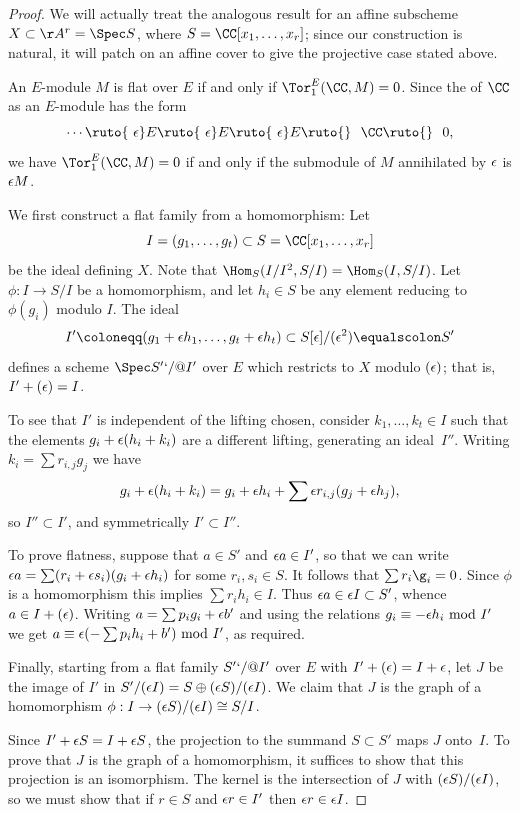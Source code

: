 \begin{proof}
We will actually treat the analogous result for an affine subscheme $X
\subset \AA^r = \Spec S$, where
$S = \CC[x_{1}, \dots, x_{r}]$; since our construction is natural,
it will patch on an affine cover to give the projective case stated above.

An $E$-module $M$ is flat
%
over $E$ if and only if $\Tor_1^E(\CC,M) = 0$.
Since the
%
of $\CC$ as an $E$-module has the form
$$
\cdots \ruto {\ \eps} E \ruto {\ \eps} E \ruto {\ \eps} E
\ruto{}\ \ \CC \ruto{}\ \ 0,
$$
we have $\Tor_1^E(\CC,M)=0$ if and only if the submodule of $M$
annihilated by $\eps$ is $\eps M$.

We first construct a flat family from a homomorphism: Let
$$I = (g_1,\dots,
g_t)\subset S = \CC[x_1,\dots, x_r]
$$
be the ideal defining $X$.
Note that $\Hom_S(I/I^2, S/I) = \Hom_S(I,S/I)$. Let $\phi: I\to S/I$
be a homomorphism, and let $h_i\in S$ be
any element reducing to $\phi(g_i)$ modulo $I$.  The ideal
$$
I' \coloneqq  (g_1+\eps h_1,\dots, g_t+\eps h_t)\subset
S[\eps]/(\eps^2) \equalscolon S'
$$
defines a scheme $\Spec S'`/@I'$  over $E$ which restricts to $X$ modulo
$(\eps)$; that is, $I' +\nobreak (\eps) =\nobreak  I$.

To see that $I'$ is
independent of the lifting chosen,
consider
$k_1,\dots,k_t\in I$
such
that the elements $g_i+\eps(h_i+k_i)$ are a different lifting,
generating an ideal~$I''$.
Writing $k_i = \sum r_{i,j}g_j$ we have
$$
g_i+\eps(h_i+k_i) = g_i+\eps h_i+ \sum \eps r_{i,j}(g_j+\eps h_j)
,
$$
 so
$I'' \subset I'$, and symmetrically $I' \subset I''$.

To prove flatness, suppose that $a\in S'$ and  $\eps a  \in I'$,
so that we can write  $\eps a= \sum(r_i+\eps s_i)(g_i+\eps h_i)$ for
some $r_{i}, s_{i} \in S$.
It follows that
$\sum r_i\g_i = 0$. Since $\phi$ is a homomorphism this implies $\sum
r_i h_i \in I$. Thus
$\eps a \in  \eps I\subset S'$, whence $a\in I + (\eps)$.  Writing $a
=\sum p_i g_i+\eps b'$
and using the relations $g_i \equiv -\eps h_i \hbox{ mod } I'$ we get
 $a \equiv \eps (-\sum p_i h_i+b') \hbox{ mod } I'$, as required.

Finally, starting from a flat family $S'`/@I'$ over $E$ with $I' + (\eps)
= I +\eps$,
let $J$ be the image of $I'$ in $S'/(\eps I) = S \oplus (\eps S)/(\eps
I)$. We claim that $J$ is the graph of a homomorphism $\phi: I \to
(\eps S)/(\eps I) \cong S/I$.

Since $I' + \eps S = I +\eps S$,  the projection  to the  summand
$S\subset S'$ maps $J$ onto~$I$.
To prove that $J$ is the graph of a homomorphism, it suffices to show
that this projection is an isomorphism.
The kernel is
the intersection of $J$ with $(\eps S)/(\eps I )$, so we must show that
if $r\in S$ and $\eps r \in I'$ then $\eps r \in \eps I$.


\end{proof}
